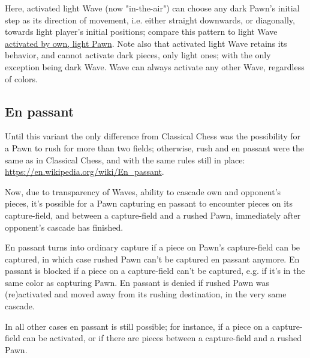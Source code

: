 \vspace*{-0.5\baselineskip}
Here, activated light Wave (now "in-the-air") can choose any dark Pawn's initial
step as its direction of movement, i.e. either straight downwards, or diagonally,
towards light player's initial positions; compare this pattern to light Wave
\hyperref[fig:scn_mv_24_wave_activated_by_capture_pawn]{activated by own, light Pawn}.\newline
\indent
Note also that activated light Wave retains its behavior, and cannot activate dark
pieces, only light ones; with the only exception being dark Wave. Wave can always
activate any other Wave, regardless of colors.

\clearpage %

\subsection*{En passant}
\label{sec:Miranda's veil/Wave/En passant}

Until this variant the only difference from Classical Chess was the possibility
for a Pawn to rush for more than two fields; otherwise, rush and en passant were
the same as in Classical Chess, and with the same rules still in place:\newline
\href{https://en.wikipedia.org/wiki/En\_passant}{https://en.wikipedia.org/wiki/En\_passant}.

Now, due to transparency of Waves, ability to cascade own and opponent's pieces, it's
possible for a Pawn capturing en passant to encounter pieces on its capture-field,
and between a capture-field and a rushed Pawn, immediately after opponent's cascade
has finished.

En passant turns into ordinary capture if a piece on Pawn's capture-field can be
captured, in which case rushed Pawn can't be captured en passant anymore.
En passant is blocked if a piece on a capture-field can't be captured, e.g. if
it's in the same color as capturing Pawn. En passant is denied if rushed Pawn was
(re)activated and moved away from its rushing destination, in the very same
cascade.

In all other cases en passant is still possible; for instance, if a piece on a
capture-field can be activated, or if there are pieces between a capture-field
and a rushed Pawn.

